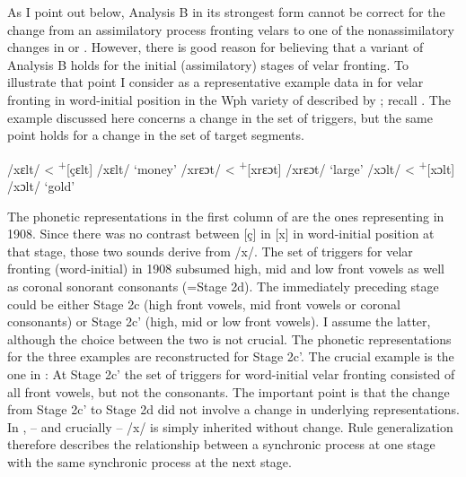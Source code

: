 As I point out below, Analysis B in its strongest form cannot be correct for the change from an assimilatory process fronting velars to one of the nonassimilatory changes in  or . However, there is good reason for believing that a variant of Analysis B holds for the initial (assimilatory) stages of velar fronting. To illustrate that point I consider as a representative example data in  for velar fronting in word-initial position in the Wph variety of  described by \citet{Arens1908}; recall . The example discussed here concerns a change in the set of triggers, but the same point holds for a change in the set of target segments.



\ea\label{ex:14:46}
\ea\label{ex:14:46a}\relax  [çɛlt]  /xɛlt/  \tab < \tab \textsuperscript{+}[çɛlt]  /xɛlt/  \tab ‘money’
\ex\label{ex:14:46b}\relax  [çrɛɔt] /xrɛɔt/ \tab < \tab \textsuperscript{+}[xrɛɔt] /xrɛɔt/ \tab ‘large’
\ex\label{ex:14:46c}\relax  [xɔlt] /xɔlt/   \tab < \tab \textsuperscript{+}[xɔlt] /xɔlt/   \tab ‘gold’
\z 
\z 

The phonetic representations in the first column of  are the ones representing  in 1908. Since there was no contrast between [ç] in [x] in word-initial position at that stage, those two sounds derive from /x/. The set of triggers for velar fronting (word-initial) in 1908 subsumed high, mid and low front vowels as well as coronal sonorant consonants (=Stage 2d). The immediately preceding stage could be either Stage 2c (high front vowels, mid front vowels or coronal consonants) or Stage 2c' (high, mid or low front vowels). I assume the latter, although the choice between the two is not crucial. The phonetic representations for the three examples are reconstructed for Stage 2c'. The crucial example is the one in : At Stage 2c' the set of triggers for word-initial velar fronting consisted of all front vowels, but not the consonants. The important point is that the change from Stage 2c' to Stage 2d did not involve a change in underlying representations. In ,  -- and crucially  -- /x/ is simply inherited without change. Rule generalization therefore describes the relationship between a synchronic process at one stage with the same synchronic process at the next stage.

